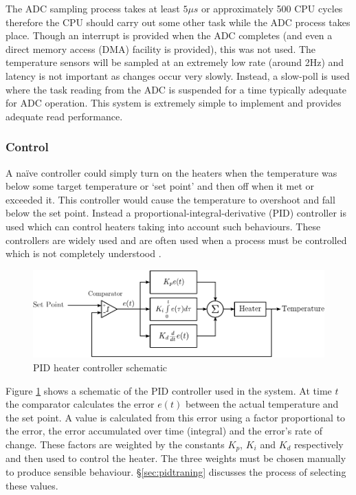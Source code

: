 				The ADC sampling process takes at least $5\mu{}s$ or approximately 500
				CPU cycles \cite{lpc1768} therefore the CPU should carry out some other
				task while the ADC process takes place. Though an interrupt is provided
				when the ADC completes (and even a direct memory access (DMA) facility
				is provided), this was not used. The temperature sensors will be sampled
				at an extremely low rate (around 2Hz) and latency is not important as
				changes occur very slowly. Instead, a slow-poll is used where the task
				reading from the ADC is suspended for a time typically adequate for ADC
				operation. This system is extremely simple to implement and provides
				adequate read performance.
			
			\subsubsection{Control}
				
				A na\"{i}ve controller could simply turn on the heaters when the
				temperature was below some target temperature or `set point' and then
				off when it met or exceeded it. This controller would cause the
				temperature to overshoot and fall below the set point. Instead a
				proportional-integral-derivative (PID) controller is used which can
				control heaters taking into account such behaviours. These controllers
				are widely used and are often used when a process must be controlled
				which is not completely understood \cite{controleng}.
				
				\begin{figure}
					\includegraphics[width=1\textwidth]{diagrams/pid.pdf}
					\caption{PID heater controller schematic}
					\label{fig:pid}
				\end{figure}
				
				Figure \ref{fig:pid} shows a schematic of the PID controller used in the
				system. At time $t$ the comparator calculates the error $e(t)$ between
				the actual temperature and the set point. A value is calculated from
				this error using a factor proportional to the error, the error
				accumulated over time (integral) and the error's rate of change. These
				factors are weighted by the constants $K_p$, $K_i$ and $K_d$
				respectively and then used to control the heater. The three weights must
				be chosen manually to produce sensible behaviour.
				\S\ref{sec:pidtraning} discusses the process of selecting these values.
				
